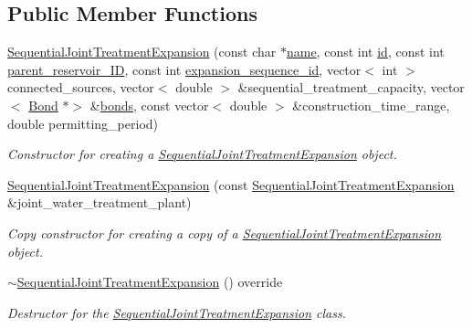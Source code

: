 \subsection*{Public Member Functions}
\begin{DoxyCompactItemize}
\item 
\mbox{\hyperlink{classSequentialJointTreatmentExpansion_ad3ca28eaaa041be6ebbd0a4593d5c9ab}{Sequential\+Joint\+Treatment\+Expansion}} (const char $\ast$\mbox{\hyperlink{classWaterSource_a846ea74c5b453d014f594d41fee8c765}{name}}, const int \mbox{\hyperlink{classWaterSource_a6eafe5dfefd317877d1244e8a7c6e742}{id}}, const int \mbox{\hyperlink{classSequentialJointTreatmentExpansion_a43b9e27138606bbbf8e5ef0279232a0a}{parent\+\_\+reservoir\+\_\+\+ID}}, const int \mbox{\hyperlink{classSequentialJointTreatmentExpansion_adeaf6ba2bcfc4c024e332764144e3021}{expansion\+\_\+sequence\+\_\+id}}, vector$<$ int $>$ connected\+\_\+sources, vector$<$ double $>$ \&sequential\+\_\+treatment\+\_\+capacity, vector$<$ \mbox{\hyperlink{classBond}{Bond}} $\ast$$>$ \&\mbox{\hyperlink{classWaterSource_a413b094e11bdce62f4d82e5bb9e4706e}{bonds}}, const vector$<$ double $>$ \&construction\+\_\+time\+\_\+range, double permitting\+\_\+period)
\begin{DoxyCompactList}\small\item\em Constructor for creating a \mbox{\hyperlink{classSequentialJointTreatmentExpansion}{Sequential\+Joint\+Treatment\+Expansion}} object. \end{DoxyCompactList}\item 
\mbox{\hyperlink{classSequentialJointTreatmentExpansion_a677aa8de08ba7116216509b1a6d74b14}{Sequential\+Joint\+Treatment\+Expansion}} (const \mbox{\hyperlink{classSequentialJointTreatmentExpansion}{Sequential\+Joint\+Treatment\+Expansion}} \&joint\+\_\+water\+\_\+treatment\+\_\+plant)
\begin{DoxyCompactList}\small\item\em Copy constructor for creating a copy of a \mbox{\hyperlink{classSequentialJointTreatmentExpansion}{Sequential\+Joint\+Treatment\+Expansion}} object. \end{DoxyCompactList}\item 
\mbox{\hyperlink{classSequentialJointTreatmentExpansion_a77d4270fd89d172739fdede5b9e6c1e9}{$\sim$\+Sequential\+Joint\+Treatment\+Expansion}} () override
\begin{DoxyCompactList}\small\item\em Destructor for the \mbox{\hyperlink{classSequentialJointTreatmentExpansion}{Sequential\+Joint\+Treatment\+Expansion}} class. \end{DoxyCompactList}\item 
$$
\end{DoxyCompactItemize}
